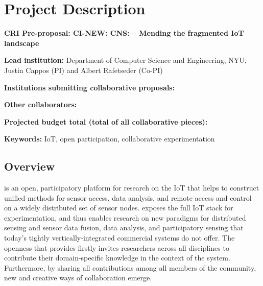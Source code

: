 
\section{Project Description}


\textbf{CRI Pre-proposal: CI-NEW: CNS: \sysname -- Mending the fragmented \acrshort{IoT} landscape}

\textbf{Lead institution:} Department of Computer Science and Engineering, NYU, Justin Cappos (PI) and Albert Rafetseder (Co-PI)

\textbf{Institutions submitting collaborative proposals:} \todo{}

\textbf{Other collaborators:} 

\textbf{Projected budget total (total of all collaborative pieces):} \todo{}

\textbf{Keywords:} \acrlong{IoT}, open participation,
collaborative experimentation


\subsection{Overview}

\sysname is an open, participatory platform for research on the \acrfull{IoT}
that helps to construct unified methods for sensor access, data analysis,
and remote access and control on a widely distributed set of sensor
nodes.
\sysname exposes the full \gls{IoT}
stack for experimentation, and thus enables research on new paradigms
for distributed sensing and sensor data fusion, data analysis, and
participatory sensing that today's tightly vertically-integrated
commercial systems do not offer.
The openness that \sysname provides firstly invites researchers
across all disciplines to contribute their domain-specific
knowledge in the context of the system.
Furthermore, by sharing all contributions among all members of
the community, new and creative ways of collaboration emerge.

